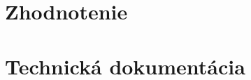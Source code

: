 \documentclass[a4paper,slovak,12pt,appendix]{article}
\begin{document}
\newpage
\section{Zhodnotenie}


\newpage
\section{Technická dokumentácia}





\newpage


\end{document}
